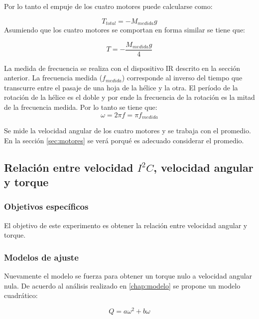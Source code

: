 \documentclass[main]{subfiles}
\begin{document}
Por lo tanto el empuje de los cuatro motores puede calcularse como:

\begin{equation}
T_{total}=-M_{medida}g
\end{equation}
Asumiendo que los cuatro motores se comportan en forma similar se tiene que:

\begin{equation}
T=-\frac{M_{medida}g}{4}
\end{equation}

La medida de frecuencia se realiza con el dispositivo IR descrito en la secci\'on anterior. La frecuencia medida ($f_{medida}$) corresponde al inverso del tiempo que transcurre entre el pasaje de una hoja de la h\'elice y la otra. El per\'iodo de la rotaci\'on de la h\'elice es el doble y por ende la frecuencia de la rotaci\'on es la mitad de la frecuencia medida. Por lo tanto se tiene que:
\begin{equation}
\label{eq:omega_ir}
\omega=2\pi f=\pi f_{medida}
\end{equation}

Se mide la velocidad angular de los cuatro motores y se trabaja con el promedio. En la secci\'on \ref{sec:motores} se ver\'a porqu\'e es adecuado considerar el promedio.

\subsection{Relaci\'on entre velocidad $I^2C$, velocidad angular y torque}

\subsubsection*{Objetivos espec\'ificos}
El objetivo de este experimento es obtener la relaci\'on entre velocidad angular y torque.

\subsubsection*{Modelos de ajuste}
Nuevamente el modelo se fuerza para obtener un torque nulo a velocidad angular nula. De acuerdo al an\'alisis realizado en \ref{chap:modelo} se propone un modelo cuadr\'atico:

$$Q=a\omega^2+b\omega$$
\end{document}

